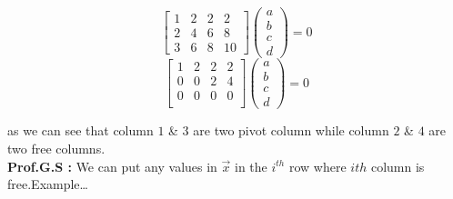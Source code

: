 \documentclass[a4paper,11pt]{article}
\numberwithin{equation}{section}
\begin{document}
\begin{itemize}
\begin{center}
    \[
        \begin{bmatrix}
            1&2&2&2\\
            2&4&6&8\\
            3&6&8&10
        \end{bmatrix}
        \begin{pmatrix}
            a\\
            b\\
            c\\
            d
        \end{pmatrix}=0
    \]
    \[
        \begin{bmatrix}
            1&2&2&2\\
            0&0&2&4\\
            0&0&0&0\\
        \end{bmatrix}
        \begin{pmatrix}
            a\\
            b\\
            c\\
            d
        \end{pmatrix}=0
    \]
\end{center}

as we can see that column $1$ \& $3$ are two pivot column while column  $2$ \& $4$ are two free columns.\\

\textbf{Prof.G.S : }We can put any values in $\vec{x}$ in the $i^{th}$  row where $i{th}$ column is free.Example\dots\\


\end{itemize}
\end{document}
